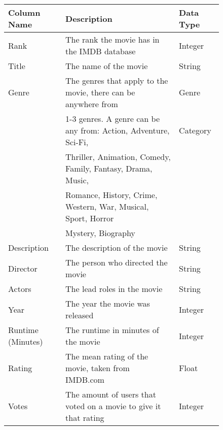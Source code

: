         \begin{figure}[h]
            \centering
            \begin{tabular}[width = \textwidth]{lll}
                \toprule
                Column Name &           Description                                                                 & Data Type \\
                \midrule
                Rank &                  The rank the movie has in the IMDB database                                 & Integer \\          
                Title &                 The name of the movie                                                       & String \\
                Genre &                 The genres that apply to the movie, there can be anywhere from              & Genre \\
                {}      &               1-3 genres. A genre can be any from: Action, Adventure, Sci-Fi,             & Category \\
                {}      &               Thriller, Animation, Comedy, Family, Fantasy, Drama, Music,                 & {} \\
                {}      &               Romance, History, Crime, Western, War, Musical, Sport, Horror               & {} \\
                {}      &               Mystery, Biography                                                          & {} \\
                Description &           The description of the movie                                                & String \\
                Director &              The person who directed the movie                                           & String \\
                Actors &                The lead roles in the movie                                                 & String \\
                Year  &                 The year the movie was released                                             & Integer \\
                Runtime (Minutes) &     The runtime in minutes of the movie                                         & Integer \\ 
                Rating   &              The mean rating of the movie, taken from IMDB.com                           & Float \\
                Votes   &               The amount of users that voted on a movie to give it that rating            & Integer \\ 

\end{tabular}
\end{figure}
